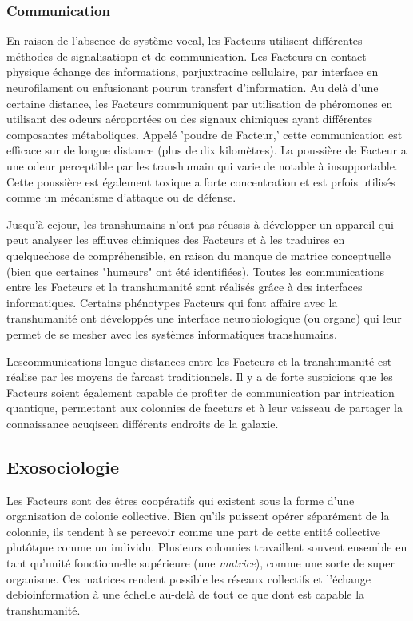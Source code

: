 \subsubsection{Communication } 

En raison de l'absence de système vocal, les Facteurs utilisent différentes méthodes de signalisatiopn et de communication. Les Facteurs en contact physique échange des informations, parjuxtracine cellulaire, par interface en neurofilament ou enfusionant pourun transfert d'information. Au delà d'une certaine distance, les Facteurs communiquent par utilisation de phéromones en utilisant des odeurs aéroportées ou des signaux chimiques ayant différentes composantes métaboliques. Appelé 'poudre de Facteur,' cette communication est efficace sur de longue distance (plus de dix kilomètres). La poussière de Facteur a une odeur perceptible par les transhumain qui varie de notable à insupportable. Cette poussière est également toxique a forte concentration et est prfois utilisés comme un mécanisme d'attaque ou de défense. 

Jusqu'à cejour, les transhumains n'ont pas réussis à développer un appareil qui peut analyser les effluves chimiques des Facteurs et à les traduires en quelquechose de compréhensible, en raison du manque de matrice conceptuelle (bien que certaines "humeurs" ont été identifiées). Toutes les communications entre les Facteurs et la transhumanité sont réalisés grâce à des interfaces informatiques. Certains phénotypes Facteurs qui font affaire avec la transhumanité ont développés une interface neurobiologique (ou organe) qui leur permet de se mesher avec les systèmes informatiques transhumains. 

Lescommunications longue distances entre les Facteurs et la transhumanité est réalise par les moyens de farcast traditionnels. Il y a de forte suspicions que les Facteurs soient également capable de profiter de communication par intrication quantique, permettant aux colonnies de faceturs et à leur vaisseau de partager la connaissance acuqiseen différents endroits de la galaxie. 

\subsection{Exosociologie} 

Les Facteurs sont des êtres coopératifs qui existent sous la forme d'une organisation de colonie collective. Bien qu'ils puissent opérer séparément de la colonnie, ils tendent à se percevoir comme une part de cette entité collective plutôtque comme un individu. Plusieurs colonnies travaillent souvent ensemble en tant qu'unité fonctionnelle supérieure (une \textit{matrice}), comme une sorte de super organisme. Ces matrices rendent possible les réseaux collectifs et l'échange debioinformation à une échelle au-delà de tout ce que dont est capable la transhumanité. 

